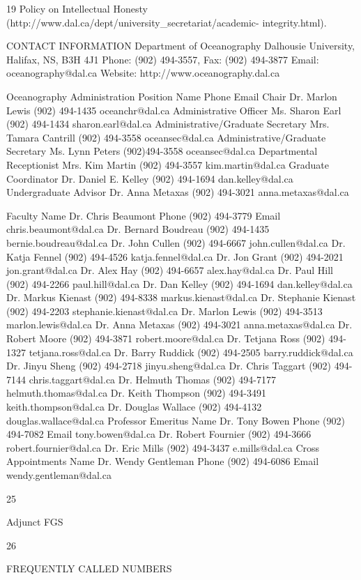 19 Policy on Intellectual Honesty (http://www.dal.ca/dept/university_secretariat/academic- integrity.html).
 

CONTACT  INFORMATION
Department of Oceanography Dalhousie University, Halifax, NS, B3H 4J1 Phone: (902) 494-3557, Fax: (902) 494-3877
Email: oceanography@dal.ca Website: http://www.oceanography.dal.ca

Oceanography Administration
Position	Name	Phone	Email
Chair	Dr. Marlon Lewis	(902) 494-1435	oceanchr@dal.ca Administrative Officer	Ms. Sharon Earl	(902) 494-1434	sharon.earl@dal.ca Administrative/Graduate Secretary	Mrs. Tamara Cantrill	(902) 494-3558	oceansec@dal.ca Administrative/Graduate Secretary	Ms. Lynn Peters	(902)494-3558	oceansec@dal.ca Departmental Receptionist	Mrs. Kim Martin	(902) 494-3557	kim.martin@dal.ca Graduate Coordinator	Dr. Daniel E. Kelley	(902) 494-1694	dan.kelley@dal.ca Undergraduate Advisor	Dr. Anna Metaxas	(902) 494-3021	anna.metaxas@dal.ca




Faculty	Name
Dr. Chris Beaumont	Phone
(902) 494-3779	Email
chris.beaumont@dal.ca
	Dr. Bernard Boudreau	(902) 494-1435	bernie.boudreau@dal.ca
	Dr. John Cullen	(902) 494-6667	john.cullen@dal.ca
	Dr. Katja Fennel	(902) 494-4526	katja.fennel@dal.ca
	Dr. Jon Grant	(902) 494-2021	jon.grant@dal.ca
	Dr. Alex Hay	(902) 494-6657	alex.hay@dal.ca
	Dr. Paul Hill	(902) 494-2266	paul.hill@dal.ca
	Dr. Dan Kelley	(902) 494-1694	dan.kelley@dal.ca
	Dr. Markus Kienast	(902) 494-8338	markus.kienast@dal.ca
	Dr. Stephanie Kienast	(902) 494-2203	stephanie.kienast@dal.ca
	Dr. Marlon Lewis	(902) 494-3513	marlon.lewis@dal.ca
	Dr. Anna Metaxas	(902) 494-3021	anna.metaxas@dal.ca
	Dr. Robert Moore	(902) 494-3871	robert.moore@dal.ca
	Dr. Tetjana Ross	(902) 494-1327	tetjana.ross@dal.ca
	Dr. Barry Ruddick	(902) 494-2505	barry.ruddick@dal.ca
	Dr. Jinyu Sheng	(902) 494-2718	jinyu.sheng@dal.ca
	Dr. Chris Taggart	(902) 494-7144	chris.taggart@dal.ca
	Dr. Helmuth Thomas	(902) 494-7177	helmuth.thomas@dal.ca
	Dr. Keith Thompson	(902) 494-3491	keith.thompson@dal.ca
	Dr. Douglas Wallace	(902) 494-4132	douglas.wallace@dal.ca
Professor Emeritus	Name
Dr. Tony Bowen	Phone
(902) 494-7082	Email
tony.bowen@dal.ca
	Dr. Robert Fournier	(902) 494-3666	robert.fournier@dal.ca
	Dr. Eric Mills	(902) 494-3437	e.mills@dal.ca
Cross Appointments	Name
Dr. Wendy Gentleman	Phone
(902) 494-6086	Email
wendy.gentleman@dal.ca
 
25





Adjunct FGS
 
26


FREQUENTLY CALLED NUMBERS
	  

